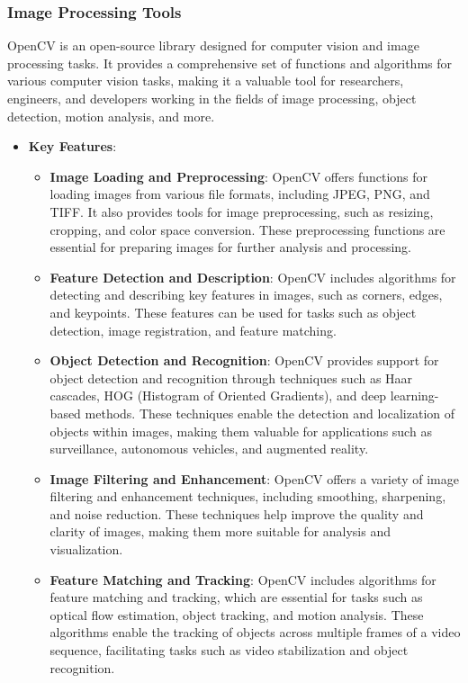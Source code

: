   \subsubsection{Image Processing Tools}
  OpenCV is an open-source library designed for computer vision and image processing tasks. It provides a comprehensive set of functions and algorithms for various computer vision tasks, making it a valuable tool for researchers, engineers, and developers working in the fields of image processing, object detection, motion analysis, and more.
  \begin{itemize}
    \item \textbf{Key Features}:
      \begin{itemize}
        \item \textbf{Image Loading and Preprocessing}: OpenCV offers functions for loading images from various file formats, including JPEG, PNG, and TIFF. It also provides tools for image preprocessing, such as resizing, cropping, and color space conversion. These preprocessing functions are essential for preparing images for further analysis and processing.
        
        \item \textbf{Feature Detection and Description}: OpenCV includes algorithms for detecting and describing key features in images, such as corners, edges, and keypoints. These features can be used for tasks such as object detection, image registration, and feature matching.
        
        \item \textbf{Object Detection and Recognition}: OpenCV provides support for object detection and recognition through techniques such as Haar cascades, HOG (Histogram of Oriented Gradients), and deep learning-based methods. These techniques enable the detection and localization of objects within images, making them valuable for applications such as surveillance, autonomous vehicles, and augmented reality.
        
        \item \textbf{Image Filtering and Enhancement}: OpenCV offers a variety of image filtering and enhancement techniques, including smoothing, sharpening, and noise reduction. These techniques help improve the quality and clarity of images, making them more suitable for analysis and visualization.
        
        \item \textbf{Feature Matching and Tracking}: OpenCV includes algorithms for feature matching and tracking, which are essential for tasks such as optical flow estimation, object tracking, and motion analysis. These algorithms enable the tracking of objects across multiple frames of a video sequence, facilitating tasks such as video stabilization and object recognition.
        

\end{itemize}
\end{itemize}
